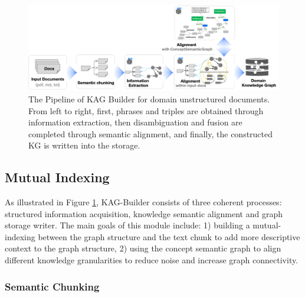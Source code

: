 \documentclass{article}
\begin{document}
\begin{figure}[htbp]
    \centering
    \includegraphics[width=1\linewidth]{figures/kagbuilder.png}
    \caption{The Pipeline of KAG Builder for domain unstructured documents. From left to right, first, phrases and triples are obtained through information extraction, then disambiguation and fusion are completed through semantic alignment, and finally, the constructed KG is written into the storage.}
    \label{fig:kg_builder}
\end{figure}

\subsection{Mutual Indexing}
As illustrated in Figure \ref{fig:kg_builder}, KAG-Builder consists of three coherent processes: structured information acquisition, knowledge semantic alignment and graph storage writer. The main goals of this module include: 1) building a mutual-indexing between the graph structure and the text chunk to add more descriptive context to the graph structure, 2) using the concept semantic graph to align different knowledge granularities to reduce noise and increase graph connectivity.

\subsubsection{Semantic Chunking}
\end{document}
